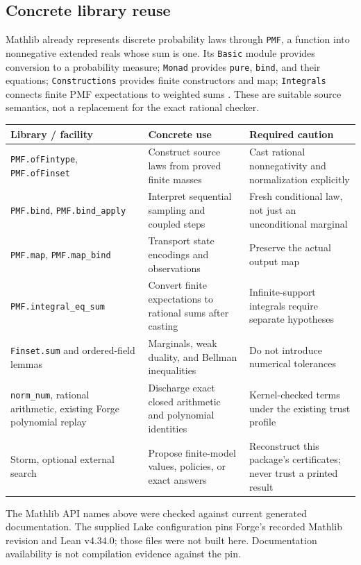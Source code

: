 \documentclass[11pt,letterpaper]{article}
\theoremstyle{definition}\newtheorem{definition}[theorem]{Definition}
\theoremstyle{remark}\newtheorem{remark}[theorem]{Remark}
\newcommand{\code}[1]{\texttt{#1}}
\begin{document}
\subsection{Concrete library reuse}
Mathlib already represents discrete probability laws through \code{PMF}, a function into nonnegative extended reals whose sum is one. Its \code{Basic} module provides conversion to a probability measure; \code{Monad} provides \code{pure}, \code{bind}, and their equations; \code{Constructions} provides finite constructors and map; \code{Integrals} connects finite PMF expectations to weighted sums \cite{pmf-basic,pmf-monad,pmf-constructions,pmf-integrals}. These are suitable source semantics, not a replacement for the exact rational checker.

\begin{longtable}{@{}L{0.28\textwidth}L{0.35\textwidth}L{0.31\textwidth}@{}}
\toprule
Library / facility & Concrete use & Required caution\\\midrule\endhead
\code{PMF.ofFintype}, \code{PMF.ofFinset} & Construct source laws from proved finite masses & Cast rational nonnegativity and normalization explicitly\\
\code{PMF.bind}, \code{PMF.bind\_apply} & Interpret sequential sampling and coupled steps & Fresh conditional law, not just an unconditional marginal\\
\code{PMF.map}, \code{PMF.map\_bind} & Transport state encodings and observations & Preserve the actual output map\\
\code{PMF.integral\_eq\_sum} & Convert finite expectations to rational sums after casting & Infinite-support integrals require separate hypotheses\\
\code{Finset.sum} and ordered-field lemmas & Marginals, weak duality, and Bellman inequalities & Do not introduce numerical tolerances\\
\code{norm\_num}, rational arithmetic, existing Forge polynomial replay & Discharge exact closed arithmetic and polynomial identities & Kernel-checked terms under the existing trust profile\\
Storm, optional external search & Propose finite-model values, policies, or exact answers & Reconstruct this package's certificates; never trust a printed result\\\bottomrule
\end{longtable}
The Mathlib API names above were checked against current generated documentation. The supplied Lake configuration pins Forge's recorded Mathlib revision and Lean v4.34.0; those files were not built here. Documentation availability is not compilation evidence against the pin.
\end{document}
